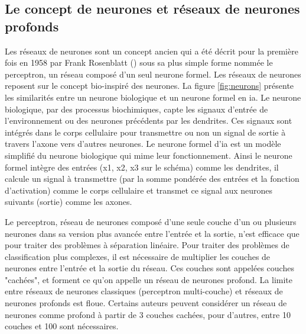 \subsection{Le concept de neurones et réseaux de neurones profonds}
Les réseaux de neurones sont un concept ancien qui a été décrit pour la première fois en 1958 par Frank Rosenblatt (\cite{rosenblatt_perceptron_1958}) sous sa plus simple forme nommée le perceptron, un réseau composé d'un seul neurone formel. Les réseaux de neurones reposent sur le concept bio-inspiré des neurones. La figure \ref{fig:neurons} présente les similarités entre un neurone biologique et un neurone formel en \gls{ia}. Le neurone biologique, par des processus biochimiques, capte les signaux d'entrée de l'environnement ou des neurones précédents par les dendrites. Ces signaux sont intégrés dans le corps cellulaire pour transmettre ou non un signal de sortie à travers l'axone vers d'autres neurones. Le neurone formel d'\gls{ia} est un modèle simplifié du neurone biologique qui mime leur fonctionnement. Ainsi le neurone formel intègre des entrées (x1, x2, x3 sur le schéma) comme les dendrites, il calcule un signal à transmettre (par la somme pondérée des entrées et la fonction d'activation) comme le corps cellulaire et transmet ce signal aux neurones suivants (sortie) comme les axones.


Le perceptron, réseau de neurones composé d'une seule couche d’un ou plusieurs neurones dans sa version plus avancée entre l'entrée et la sortie, n'est efficace que pour traiter des problèmes à séparation linéaire. Pour traiter des problèmes de classification plus complexes, il est nécessaire de multiplier les couches de neurones entre l'entrée et la sortie du réseau. Ces couches sont appelées couches "cachées", et forment ce qu'on appelle un réseau de neurones profond. La limite entre réseaux de neurones classiques (perceptron multi-couche) et réseaux de neurones profonds est floue. Certains auteurs peuvent considérer un réseau de neurones comme profond à partir de 3 couches cachées, pour d'autres, entre 10 couches et 100 sont nécessaires.


